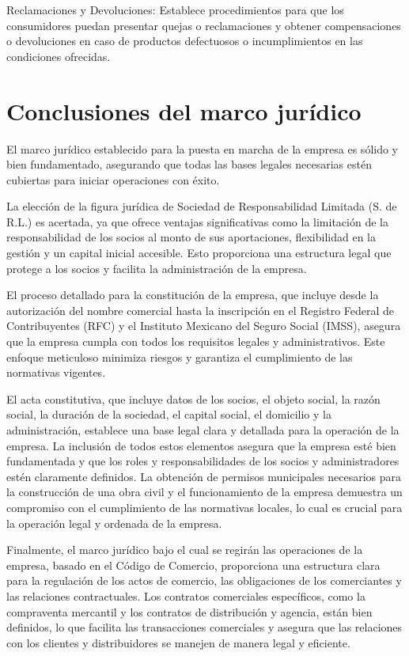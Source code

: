 Reclamaciones y Devoluciones: Establece procedimientos para que los consumidores puedan presentar quejas o reclamaciones y obtener compensaciones o devoluciones en caso de productos defectuosos o incumplimientos en las condiciones ofrecidas.

\section{Conclusiones del marco jurídico}

El marco jurídico establecido para la puesta en marcha de la empresa es sólido y bien fundamentado, asegurando que todas las bases legales necesarias estén cubiertas para iniciar operaciones con éxito.

La elección de la figura jurídica de Sociedad de Responsabilidad Limitada (S. de R.L.) es acertada, ya que ofrece ventajas significativas como la limitación de la responsabilidad de los socios al monto de sus aportaciones, flexibilidad en la gestión y un capital inicial accesible. Esto proporciona una estructura legal que protege a los socios y facilita la administración de la empresa.

El proceso detallado para la constitución de la empresa, que incluye desde la autorización del nombre comercial hasta la inscripción en el Registro Federal de Contribuyentes (RFC) y el Instituto Mexicano del Seguro Social (IMSS), asegura que la empresa cumpla con todos los requisitos legales y administrativos. Este enfoque meticuloso minimiza riesgos y garantiza el cumplimiento de las normativas vigentes.

El acta constitutiva, que incluye datos de los socios, el objeto social, la razón social, la duración de la sociedad, el capital social, el domicilio y la administración, establece una base legal clara y detallada para la operación de la empresa. La inclusión de todos estos elementos asegura que la empresa esté bien fundamentada y que los roles y responsabilidades de los socios y administradores estén claramente definidos. La obtención de permisos municipales necesarios para la construcción de una obra civil y el funcionamiento de la empresa demuestra un compromiso con el cumplimiento de las normativas locales, lo cual es crucial para la operación legal y ordenada de la empresa.

Finalmente, el marco jurídico bajo el cual se regirán las operaciones de la empresa, basado en el Código de Comercio, proporciona una estructura clara para la regulación de los actos de comercio, las obligaciones de los comerciantes y las relaciones contractuales. Los contratos comerciales específicos, como la compraventa mercantil y los contratos de distribución y agencia, están bien definidos, lo que facilita las transacciones comerciales y asegura que las relaciones con los clientes y distribuidores se manejen de manera legal y eficiente.
